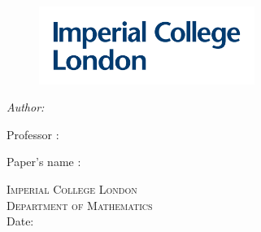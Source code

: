 \begin{titlepage}

\begin{figure}[!htb]
   \begin{minipage}{0.48\textwidth}
	  \includegraphics[width = 7cm]{LOGO.png} \\[1cm]
   \end{minipage}\hfill
\end{figure}

\begin{flushleft} \large
\vspace*{2 cm}
{\huge \bfseries \reporttitle} 
\vspace*{1.5 cm}

\textit{Author:} \reportauthor
\vspace*{1.5 cm}

{ Professor : \professor }

{Paper's name : \course}
\end{flushleft}

\vspace*{5 cm}
\begin{center}
\textsc{\Large Imperial College London}\\[0.5cm] 
\textsc{\large Department of Mathematics}\\[0.5cm] 
\makeatletter
Date: \@date 
\makeatother


\end{center}

\vfill %






\end{titlepage}